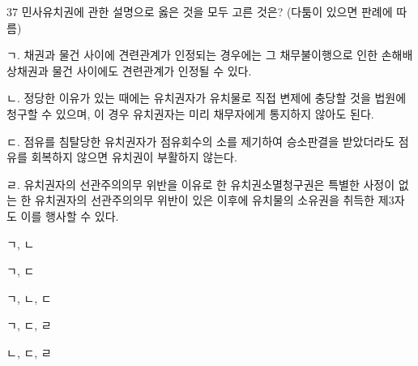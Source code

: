 \begin{question}{37}
민사유치권에 관한 설명으로 옳은 것을 모두 고른 것은? (다툼이 있으면 판례에 따름)
\begin{framedtext}
ㄱ. 채권과 물건 사이에 견련관계가 인정되는 경우에는 그 채무불이행으로 인한 손해배상채권과 물건 사이에도 견련관계가 인정될 수 있다. \par
ㄴ. 정당한 이유가 있는 때에는 유치권자가 유치물로 직접 변제에 충당할 것을 법원에 청구할 수 있으며, 이 경우 유치권자는 미리 채무자에게 통지하지 않아도 된다. \par
ㄷ. 점유를 침탈당한 유치권자가 점유회수의 소를 제기하여 승소판결을 받았더라도 점유를 회복하지 않으면 유치권이 부활하지 않는다. \par
ㄹ. 유치권자의 선관주의의무 위반을 이유로 한 유치권소멸청구권은 특별한 사정이 없는 한 유치권자의 선관주의의무 위반이 있은 이후에 유치물의 소유권을 취득한 제3자도 이를 행사할 수 있다. \par
\end{framedtext}
\begin{choices}
  \item ㄱ, ㄴ
  \item ㄱ, ㄷ
  \item ㄱ, ㄴ, ㄷ
  \item ㄱ, ㄷ, ㄹ
  \item ㄴ, ㄷ, ㄹ
\end{choices}
\end{question}
